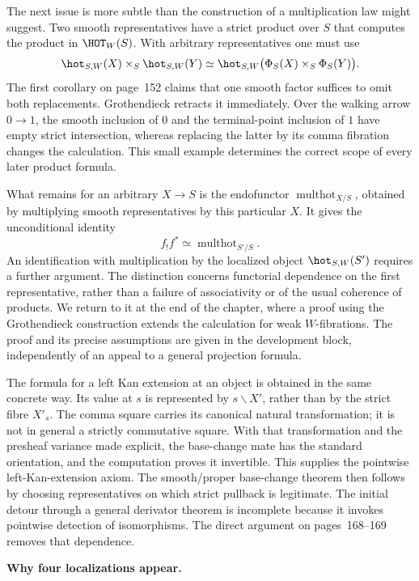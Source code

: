 The next issue is more subtle than the construction of a multiplication law might suggest. Two smooth representatives have a strict product over $S$ that computes the product in $\HOT_W(S)$. With arbitrary representatives one must use
\[
 \hot_{S,W}(X)\times_S\hot_{S,W}(Y)
 \simeq\hot_{S,W}\bigl(\Phi_S(X)\times_S\Phi_S(Y)\bigr).
\]
The first corollary on page~152 claims that one smooth factor suffices to omit both replacements. Grothendieck retracts it immediately. Over the walking arrow $0\to1$, the smooth inclusion of $0$ and the terminal-point inclusion of $1$ have empty strict intersection, whereas replacing the latter by its comma fibration changes the calculation. This small example determines the correct scope of every later product formula.

What remains for an arbitrary $X\to S$ is the endofunctor $\operatorname{multhot}_{X/S}$, obtained by multiplying smooth representatives by this particular $X$. It gives the unconditional identity
\[
 f_!f^*\simeq\operatorname{multhot}_{S'/S}.
\]
An identification with multiplication by the localized object $\hot_{S,W}(S')$ requires a further argument. The distinction concerns functorial dependence on the first representative, rather than a failure of associativity or of the usual coherence of products. We return to it at the end of the chapter, where a proof using the Grothendieck construction extends the calculation for weak $W$-fibrations. The proof and its precise assumptions are given in the development block, independently of an appeal to a general projection formula.

The formula for a left Kan extension at an object is obtained in the same concrete way. Its value at $s$ is represented by $s\backslash X'$, rather than by the strict fibre $X'_s$. The comma square carries its canonical natural transformation; it is not in general a strictly commutative square. With that transformation and the presheaf variance made explicit, the base-change mate has the standard orientation, and the computation proves it invertible. This supplies the pointwise left-Kan-extension axiom. The smooth/proper base-change theorem then follows by choosing representatives on which strict pullback is legitimate. The initial detour through a general derivator theorem is incomplete because it invokes pointwise detection of isomorphisms. The direct argument on pages~168--169 removes that dependence.

\medskip\noindent\textbf{Why four localizations appear.}

